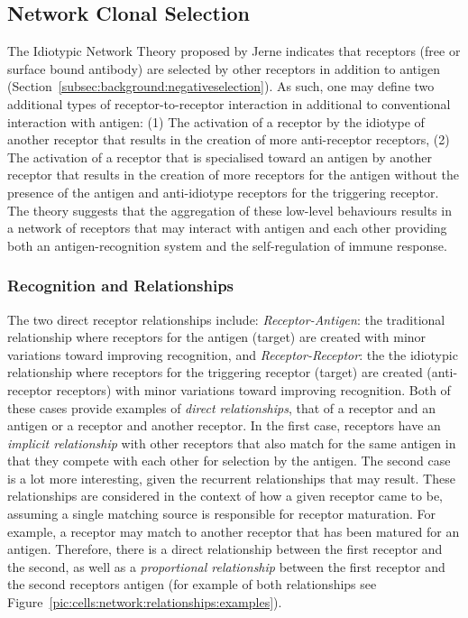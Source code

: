 %
%
\subsection{Network Clonal Selection}
\label{sec:cells:network:theory}
The Idiotypic Network Theory proposed by Jerne indicates that receptors (free or surface bound antibody) are selected by other receptors in addition to antigen (Section~\ref{subsec:background:negativeselection}). As such, one may define two additional types of receptor-to-receptor interaction in additional to conventional interaction with antigen: (1) The activation of a receptor by the idiotype of another receptor that results in the creation of more anti-receptor receptors, (2) The activation of a receptor that is specialised toward an antigen by another receptor that results in the creation of more receptors for the antigen without the presence of the antigen and anti-idiotype receptors for the triggering receptor. The theory suggests that the aggregation of these low-level behaviours results in a network of receptors that may interact with antigen and each other providing both an antigen-recognition system and the self-regulation of immune response. 


%
%
\subsubsection{Recognition and Relationships}
The two direct receptor relationships include: \emph{Receptor-Antigen}: the traditional relationship where receptors for the antigen (target) are created with minor variations toward improving recognition, and \emph{Receptor-Receptor}: the the idiotypic relationship where receptors for the triggering receptor (target) are created (anti-receptor receptors) with minor variations toward improving recognition. Both of these cases provide examples of \emph{direct relationships}, that of a receptor and an antigen or a receptor and another receptor. In the first case, receptors have an \emph{implicit relationship} with other receptors that also match for the same antigen in that they compete with each other for selection by the antigen. The second case is a lot more interesting, given the recurrent relationships that may result. These relationships are considered in the context of how a given receptor came to be, assuming a single matching source is responsible for receptor maturation. For example, a receptor may match to another receptor that has been matured for an antigen. Therefore, there is a direct relationship between the first receptor and the second, as well as a \emph{proportional relationship} between the first receptor and the second receptors antigen (for example of both relationships see Figure~\ref{pic:cells:network:relationships:examples}). 

